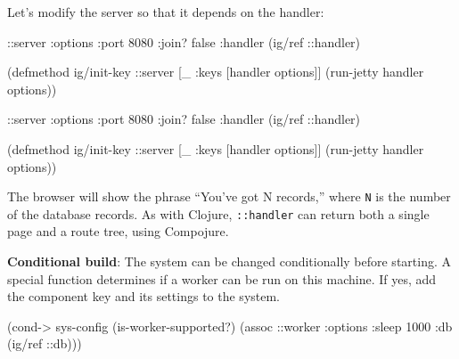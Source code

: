 \else

\begin{english}
\end{english}

\fi

\noindent
Let's modify the server so that it depends on the handler:

\ifnarrow

\begin{english}
  \begin{clojure}
{::server {:options {:port 8080
                     :join? false}
           :handler (ig/ref ::handler)}}

(defmethod ig/init-key ::server
  [_ {:keys [handler options]}]
  (run-jetty handler options))
  \end{clojure}
\end{english}

\else

\begin{english}
  \begin{clojure}
{::server {:options {:port 8080 :join? false}
           :handler (ig/ref ::handler)}}

(defmethod ig/init-key ::server
  [_ {:keys [handler options]}]
  (run-jetty handler options))
  \end{clojure}
\end{english}

\fi

The browser will show the phrase ``You've got N records,'' where \verb|N| is the number of the database records. As with Clojure, \verb|::handler| can return both a single page and a route tree, using Compojure.


\textbf{Conditional build}: The system can be changed conditionally before starting. A special function determines if a worker can be run on this machine. If yes, add the component key and its settings to the system.

\begin{english}
  \begin{clojure}
(cond-> sys-config
  (is-worker-supported?)
  (assoc ::worker {:options {:sleep 1000}
                   :db (ig/ref ::db)}))
  \end{clojure}
\end{english}


